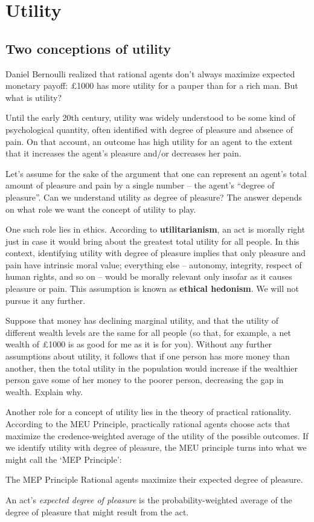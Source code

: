 \chapter{Utility}\label{ch:utility}


\section{Two conceptions of utility}

Daniel Bernoulli realized that rational agents don't always maximize expected
monetary payoff: £1000 has more utility for a pauper than for a rich man. But
what is utility?

Until the early 20th century, utility was widely understood to be some kind of
psychological quantity, often identified with degree of pleasure and absence of
pain. On that account, an outcome has high utility for an agent to the extent
that it increases the agent's pleasure and/or decreases her pain.

Let's assume for the sake of the argument that one can represent an agent's
total amount of pleasure and pain by a single number -- the agent's ``degree of
pleasure''. Can we understand utility as degree of pleasure? The answer depends
on what role we want the concept of utility to play.

One such role lies in ethics. According to \textbf{utilitarianism}, an act is
morally right just in case it would bring about the greatest total utility for
all people. In this context, identifying utility with degree of pleasure implies
that only pleasure and pain have intrinsic moral value; everything else --
autonomy, integrity, respect of human rights, and so on -- would be morally
relevant only insofar as it causes pleasure or pain. This assumption is known as
\textbf{ethical hedonism}. We will not pursue it any further.

\begin{exercise}{1}
  Suppose that money has declining marginal utility, and that the utility of
  different wealth levels are the same for all people (so that, for example, a
  net wealth of £1000 is as good for me as it is for you). Without any further
  assumptions about utility, it follows that if one person has more money than
  another, then the total utility in the population would increase if the
  wealthier person gave some of her money to the poorer person, decreasing the
  gap in wealth. Explain why.
\end{exercise}

Another role for a concept of utility lies in the theory of practical
rationality. According to the MEU Principle, practically rational agents choose
acts that maximize the credence-weighted average of the utility of the possible
outcomes. If we identify utility with degree of pleasure, the MEU principle
turns into what we might call the `MEP Principle':
%
\begin{genericthm}{The MEP Principle}
  Rational agents maximize their expected degree of pleasure. 
\end{genericthm}
%
\noindent%
An act's \emph{expected degree of pleasure} is the
probability-weighted average of the degree of pleasure that might
result from the act. 


